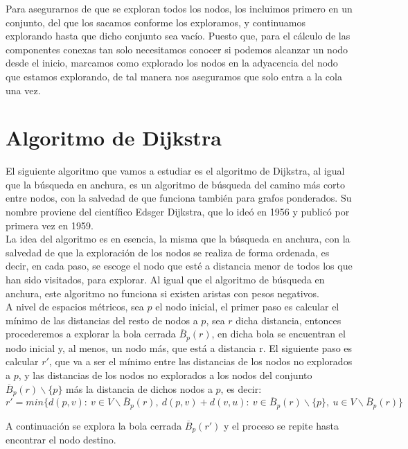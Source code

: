 Para asegurarnos de que se exploran todos los nodos, los incluimos primero en un conjunto, del que los sacamos conforme los exploramos, y continuamos explorando hasta que dicho conjunto sea vacío. Puesto que, para el cálculo de las componentes conexas tan solo necesitamos conocer si podemos alcanzar un nodo desde el inicio, marcamos como explorado los nodos en la adyacencia del nodo que estamos explorando, de tal manera nos aseguramos que solo entra a la cola una vez. 

\section{Algoritmo de Dijkstra}\label{DJK}

El siguiente algoritmo que vamos a estudiar es el algoritmo de Dijkstra, al igual que la búsqueda en anchura, es un algoritmo de búsqueda del camino más corto entre nodos, con la salvedad de que funciona también para grafos ponderados. Su nombre proviene del científico Edsger Dijkstra, que lo ideó en 1956 y publicó por primera vez en 1959. \\

La idea del algoritmo es en esencia, la misma que la búsqueda en anchura, con la salvedad de que la exploración de los nodos se realiza de forma ordenada, es decir, en cada paso, se escoge el nodo que esté a distancia menor de todos los que han sido visitados, para explorar. Al igual que el algoritmo de búsqueda en anchura, este algoritmo no funciona si existen aristas con pesos negativos. \\

A nivel de espacios métricos, sea $p$ el nodo inicial, el primer paso es calcular el mínimo de las distancias del resto de nodos a $p$, sea $r$ dicha distancia, entonces procederemos a explorar la bola cerrada $\overline B_p(r)$, en dicha bola se encuentran el nodo inicial y, al menos, un nodo más, que está a distancia r. El siguiente paso es calcular $r'$, que va a ser el mínimo entre las distancias de los nodos no explorados a $p$, y las distancias de los nodos no explorados a los nodos del conjunto $\overline B_p(r)\backslash\{p\}$ más la distancia de dichos nodos a $p$, es decir:
$$r' = min\{d(p,v):\ v \in V\backslash\overline B_p(r),\ d(p,v) + d(v,u):\ v \in \overline B_p(r)\backslash\{p\},\ u \in V\backslash\overline B_p(r)\}$$

A continuación se explora la bola cerrada $\overline B_p(r')$ y el proceso se repite hasta encontrar el nodo destino.

